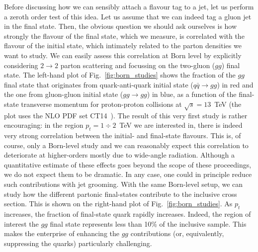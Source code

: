 Before discussing how we can sensibly attach a flavour tag to a jet, let us perform a zeroth order test of this idea. Let us assume that we can indeed tag a gluon jet in the final state. Then, the obvious question we should ask ourselves is how strongly the flavour of the final state, which we measure, is correlated with the flavour of the initial state, which intimately related to the parton densities we want to study. 
%
We can easily assess this correlation at Born level by explicitly considering $2 \to 2$ parton scattering and focussing on the two-gluon ($gg$) final state. The left-hand plot of Fig.~\ref{fig:born_studies} shows the fraction of the $gg$ final state that originates from quark-anti-quark initial state ($q \bar q \to gg$) in red and the one from gluon-gluon initial state ($gg \to gg$)  in blue, as a function of the final-state transverse momentum for proton-proton collisions at $\sqrt{s}=13$~TeV (the plot uses the NLO PDF set CT14~\cite{Dulat:2015mca}). 
%
The result of this very first study is rather encouraging: in the region $p_t=1\div2$~TeV we are interested in, there is indeed very strong correlation between the initial- and final-state flavours. This is, of course, only a Born-level study and we can reasonably expect this correlation to deteriorate at higher-orders mostly due to wide-angle radiation. 
%
Although a quantitative estimate of these effects goes beyond the scope of these proceedings, we do not expect them to be dramatic. In any case, one could in principle reduce such contributions with jet grooming. 
%
With the same Born-level setup, we can study how the different partonic final-states contribute to the inclusive cross section. This is shown on the right-hand plot of Fig.~\ref{fig:born_studies}. As $p_t$ increases, the fraction of final-state quark rapidly increases. Indeed, the region of interest the $gg$ final state represents less than 10\% of the inclusive sample. This makes the enterprise of enhancing the $gg$ contributions (or, equivalently, suppressing the quarks) particularly challenging. 



